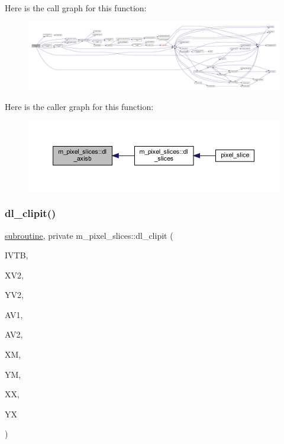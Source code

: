 Here is the call graph for this function\+:
\nopagebreak
\begin{figure}[H]
\begin{center}
\leavevmode
\includegraphics[width=350pt]{namespacem__pixel__slices_ab70907b4409a4346c450488b5bcb34a8_cgraph}
\end{center}
\end{figure}
Here is the caller graph for this function\+:
\nopagebreak
\begin{figure}[H]
\begin{center}
\leavevmode
\includegraphics[width=350pt]{namespacem__pixel__slices_ab70907b4409a4346c450488b5bcb34a8_icgraph}
\end{center}
\end{figure}
\mbox{\label{namespacem__pixel__slices_af0a3aeaa17e192568cb6a69a3b3eeab6}} 
\subsubsection{\texorpdfstring{dl\+\_\+clipit()}{dl\_clipit()}}
{\footnotesize\ttfamily \hyperlink{M__stopwatch_83_8txt_acfbcff50169d691ff02d4a123ed70482}{subroutine}, private m\+\_\+pixel\+\_\+slices\+::dl\+\_\+clipit (\begin{DoxyParamCaption}\item[{}]{I\+V\+TB,  }\item[{}]{X\+V2,  }\item[{}]{Y\+V2,  }\item[{}]{A\+V1,  }\item[{}]{A\+V2,  }\item[{}]{XM,  }\item[{}]{YM,  }\item[{}]{XX,  }\item[{}]{YX }\end{DoxyParamCaption})\hspace{0.3cm}{\ttfamily [private]}}



